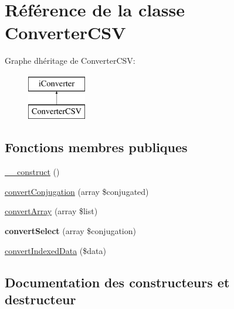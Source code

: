 \hypertarget{classConverterCSV}{}\section{Référence de la classe Converter\+C\+SV}
\label{classConverterCSV}
Graphe d\textquotesingle{}héritage de Converter\+C\+SV\+:\begin{figure}[H]
\begin{center}
\leavevmode
\includegraphics[height=2.000000cm]{classConverterCSV}
\end{center}
\end{figure}
\subsection*{Fonctions membres publiques}
\begin{DoxyCompactItemize}
\item 
\hyperlink{classConverterCSV_ad4fff7f9fd8e69926e394576558776f7}{\+\_\+\+\_\+construct} ()
\item 
\hyperlink{classConverterCSV_aff168b6953b8c9bdf43280c70e9c7170}{convert\+Conjugation} (array \$conjugated)
\item 
\hyperlink{classConverterCSV_a5bf7f48e54520210eeebdc2eb8f9e222}{convert\+Array} (array \$list)
\item 
\hypertarget{classConverterCSV_a36a4e52151f3326f7ed9f347dd30cdeb}{}\label{classConverterCSV_a36a4e52151f3326f7ed9f347dd30cdeb} 
{\bfseries convert\+Select} (array \$conjugation)
\item 
\hyperlink{classConverterCSV_a66253359624a5be3a4f5df9761b980a7}{convert\+Indexed\+Data} (\$data)
\end{DoxyCompactItemize}


\subsection{Documentation des constructeurs et destructeur}
\hypertarget{classConverterCSV_ad4fff7f9fd8e69926e394576558776f7}{}\label{classConverterCSV_ad4fff7f9fd8e69926e394576558776f7} 

